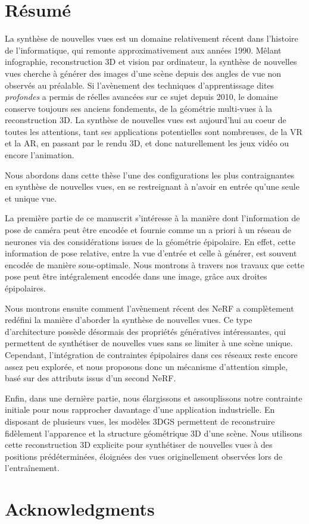 \chapter{R\'esum\'e}

La synthèse de nouvelles vues est un domaine relativement récent dans l'histoire de l'informatique, qui remonte approximativement aux années 1990. Mêlant infographie, reconstruction 3D et vision par ordinateur, la synthèse de nouvelles vues cherche à générer des images d'une scène depuis des angles de vue non observés au préalable. Si l'avènement des techniques d'apprentissage dites \textit{profondes} a permis de réelles avancées sur ce sujet depuis 2010, le domaine conserve toujours ses anciens fondements, de la géométrie multi-vues à la reconstruction 3D. La synthèse de nouvelles vues est aujourd'hui au coeur de toutes les attentions, tant ses applications potentielles sont nombreuses, de la \ac{VR} et la \ac{AR}, en passant par le rendu 3D, et donc naturellement les jeux vidéo ou encore l'animation.

Nous abordons dans cette thèse l'une des configurations les plus contraignantes en synthèse de nouvelles vues, en se restreignant à n'avoir en entrée qu'une seule et unique vue.

La première partie de ce manuscrit s'intéresse à la manière dont l'information de pose de caméra peut être encodée et fournie comme un a priori à un réseau de neurones via des considérations issues de la géométrie épipolaire. En effet, cette information de pose relative, entre la vue d'entrée et celle à générer, est souvent encodée de manière sous-optimale. Nous montrons à travers nos travaux que cette pose peut être intégralement encodée dans une image, grâce aux droites épipolaires.

Nous montrons ensuite comment l'avènement récent des \ac{NeRF} a complètement redéfini la manière d'aborder la synthèse de nouvelles vues. Ce type d'architecture possède désormais des propriétés génératives intéressantes, qui permettent de synthétiser de nouvelles vues sans se limiter à une scène unique. Cependant, l'intégration de contraintes épipolaires dans ces réseaux reste encore assez peu explorée, et nous proposons donc un mécanisme d'attention simple, basé sur des attributs issus d'un second \ac{NeRF}.

Enfin, dans une dernière partie, nous élargissons et assouplissons notre contrainte initiale pour nous rapprocher davantage d'une application industrielle. En disposant de plusieurs vues, les modèles 3D\ac{GS} permettent de reconstruire fidèlement l'apparence et la structure géométrique 3D d'une scène. Nous utilisons cette reconstruction 3D  explicite pour synthétiser de nouvelles vues à des positions prédéterminées, éloignées des vues originellement observées lors de l'entraînement. 


\cleardoublepage
\chapter{Acknowledgments}


